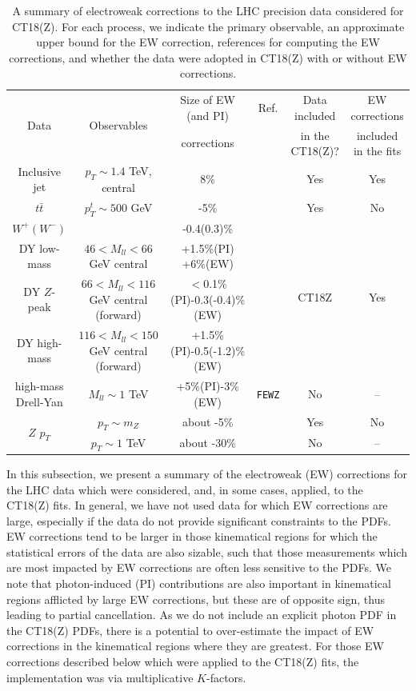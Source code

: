 \begin{table}
\caption{A summary of electroweak corrections to the LHC precision data considered for CT18(Z).  For each process, we indicate the primary observable, an approximate upper bound
for the EW correction, references for computing the EW corrections, and whether the data were adopted in CT18(Z) with or without EW corrections.}
\label{tab:EWcorrections}
\hspace*{-0.75cm}\begin{tabular}{c|c|c|c|c|c}
\hline
\multirow{2}{*}{Data} & \multirow{2}{*}{Observables}  & Size of EW (and PI)  & Ref. & Data included & EW corrections  \\
 &    & corrections & & in the CT18(Z)? & included in the fits\\
\hline
	Inclusive jet & $p_{T}\sim1.4$ TeV, central  & 8\%  & \cite{Dittmaier:2012kx} & Yes & Yes \\
\hline
	$t\bar{t}$ &$p_{T}^{t}\sim500$ GeV   &  -5\% & \cite{Czakon:2017wor} & Yes & No \\
\hline
$W^{+}(W^{-})$ &     & -0.4(0.3)\%  & \multirow{4}{*}{\cite{Aaboud:2016btc}} & \multirow{4}{*}{CT18Z} & \multirow{4}{*}{Yes}  \\
DY low-mass & $46<M_{ll}<66$ GeV central  & +1.5\%(PI) +6\%(EW) &  &     \\
DY $Z$-peak  & $66<M_{ll}<116$ GeV central (forward) & $<$0.1\%(PI)-0.3(-0.4)\%(EW)  & & \\
DY high-mass &$116<M_{ll}<150$ GeV central (forward) & +1.5\%(PI)-0.5(-1.2)\% (EW) & & \\
\hline
high-mass Drell-Yan & $M_{ll}\sim1$ TeV  & +5\%(PI)-3\%(EW)  & \texttt{FEWZ} & No  & -- \\
\hline
\multirow{2}{*}{$Z$ $p_{T}$} & $p_{T}\sim m_Z$ & about -5\%   & \cite{Kallweit:2015fta} & Yes & No \\
 & $p_{T}\sim1$ TeV & about -30\%   & \cite{Kallweit:2015fta} & No & --  \\
\hline
\end{tabular}
\end{table}

In this subsection, we present a  summary of the electroweak (EW) corrections for the LHC data which were considered, and,
in some cases, applied, to the CT18(Z) fits. In general, we have not used data for which EW corrections are large, especially
if the data do not provide significant constraints to the PDFs. EW corrections tend to be larger in those kinematical regions
for which the statistical errors of the data are also sizable, such that those measurements which are most impacted by EW corrections
are often less sensitive to the PDFs. We note that photon-induced (PI) contributions are also important in kinematical regions afflicted
by large EW corrections, but these are of opposite sign, thus leading to partial cancellation. As we do not include an explicit photon PDF 
in the CT18(Z) PDFs, there is a potential to over-estimate the impact of EW corrections in the kinematical regions where they are greatest. 
For those EW corrections described below which were applied to the CT18(Z) fits, the implementation
was via multiplicative $K$-factors.

